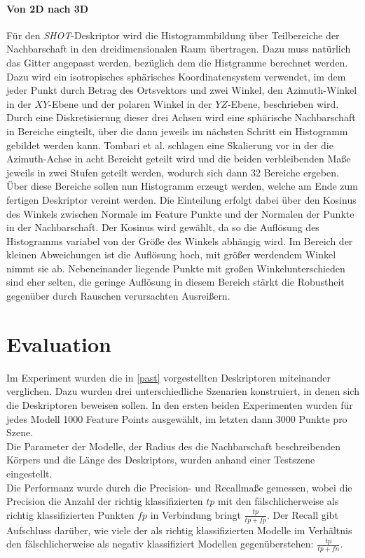 \documentclass[12pt]{article}
\begin{document}
\paragraph{Von 2D nach 3D}
Für den \textit{SHOT}-Deskriptor wird die Histogrammbildung über Teilbereiche der Nachbarschaft in den dreidimensionalen Raum übertragen. Dazu muss natürlich das Gitter angepasst werden, bezüglich dem die Histgramme berechnet werden. Dazu wird ein isotropisches sphärisches Koordinatensystem verwendet, im dem jeder Punkt durch Betrag des Ortsvektors und zwei Winkel, den Azimuth-Winkel in der $XY$-Ebene und der polaren Winkel in der $YZ$-Ebene, beschrieben wird.
Durch eine Diskretisierung dieser drei Achsen wird eine sphärische Nachbarschaft in Bereiche eingteilt, über die dann jeweils im nächsten Schritt ein Histogramm gebildet werden kann. Tombari et al. schlagen eine Skalierung vor in der die Azimuth-Achse in acht Bereicht geteilt wird und die beiden verbleibenden Maße jeweils in zwei Stufen geteilt werden, wodurch sich dann 32 Bereiche ergeben. \\
Über diese Bereiche sollen nun Histogramm erzeugt werden, welche am Ende zum fertigen Deskriptor vereint werden.
Die Einteilung erfolgt dabei über den Kosinus des Winkels zwischen Normale im Feature Punkte und der Normalen der Punkte in der Nachbarschaft. Der Kosinus wird gewählt, da so die Auflösung des Histogramms variabel von der Größe des Winkels abhängig wird. Im Bereich der kleinen Abweichungen ist die Auflösung hoch, mit größer werdendem Winkel nimmt sie ab. Nebeneinander liegende Punkte mit großen Winkelunterschieden sind eher selten, die geringe Auflösung in diesem Bereich stärkt die Robustheit gegenüber durch Rauschen verursachten Ausreißern.

\section{Evaluation}\label{eval}
Im Experiment wurden die in \ref{past} vorgestellten Deskriptoren miteinander verglichen. Dazu wurden drei unterschiedliche Szenarien konstruiert, in denen sich die Deskriptoren beweisen sollen. In den ersten beiden Experimenten wurden für jedes Modell 1000 Feature Points ausgewählt, im letzten dann 3000 Punkte pro Szene.\\
Die Parameter der Modelle, der Radius des die Nachbarschaft beschreibenden Körpers und die Länge des Deskriptors, wurden anhand einer Testszene eingestellt.\\
Die Performanz wurde durch die Precision- und Recallmaße gemessen, wobei die Precision die Anzahl der richtig klassifizierten $tp$ mit den fälschlicherweise als richtig klassifizierten Punkten $fp$ in Verbindung bringt $\frac{tp}{tp+fp}$. Der Recall gibt Aufschluss darüber, wie viele der als richtig klassifizierten Modelle im Verhältnis den fälschlicherweise als negativ klassifiziert Modellen gegenüberstehen: $\frac{tp}{tp+fn}$.
\end{document}
